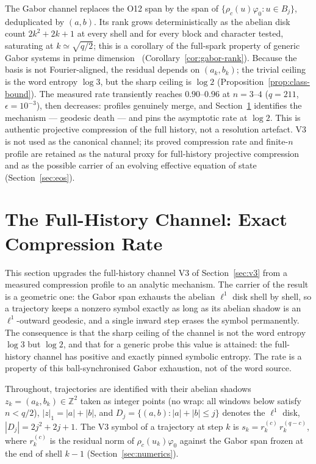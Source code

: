 \documentclass[11pt]{article}
\begin{document}
The Gabor channel replaces the O12 span by the span of $\{\rho_c(u)\varphi_0 : u\in B_j\}$, deduplicated by
$(a,b)$.
Its rank grows deterministically as the abelian disk count $2k^2+2k+1$ at every shell and for every block and
character tested, saturating at $k\simeq\sqrt{q/2}$; this is a corollary of the full-spark property of
generic Gabor systems in prime dimension~\cite{Lawrence2005,Malikiosis2015} (Corollary~\ref{cor:gabor-rank}).
Because the basis is not Fourier-aligned, the residual depends on $(a_k,b_k)$; the trivial ceiling is the
word entropy $\log 3$, but the sharp ceiling is $\log 2$ (Proposition~\ref{prop:class-bound}).
The measured rate transiently reaches $0.90$--$0.96$ at $n=3$--$4$ ($q=211$, $\epsilon=10^{-3}$), then
decreases: profiles genuinely merge, and Section~\ref{sec:fullhistory} identifies the mechanism --- geodesic
death --- and pins the asymptotic rate at $\log 2$.
This is authentic projective compression of the full history, not a resolution artefact.
V3 is not used as the canonical channel; its proved compression rate and finite-$n$ profile are retained as
the natural proxy for full-history projective compression and as the possible carrier of an evolving
effective equation of state (Section~\ref{sec:eos}).

\section{The Full-History Channel: Exact Compression Rate}
\label{sec:fullhistory}

This section upgrades the full-history channel V3 of Section~\ref{sec:v3} from a measured compression profile
to an analytic mechanism.
The carrier of the result is a geometric one: the Gabor span exhausts the abelian $\ell^1$ disk shell by
shell, so a trajectory keeps a nonzero symbol exactly as long as its abelian shadow is an $\ell^1$-outward
geodesic, and a single inward step erases the symbol permanently.
The consequence is that the sharp ceiling of the channel is not the word entropy $\log 3$ but $\log 2$, and
that for a generic probe this value is attained: the full-history channel has positive and exactly pinned
symbolic entropy.
The rate is a property of this ball-synchronised Gabor exhaustion, not of the word source.

Throughout, trajectories are identified with their abelian shadows $z_k=(a_k,b_k)\in\mathbb{Z}^2$ taken as
integer points (no wrap: all windows below satisfy $n<q/2$), $|z|_1=|a|+|b|$, and
$D_j=\{(a,b):|a|+|b|\le j\}$ denotes the $\ell^1$ disk, $|D_j|=2j^2+2j+1$.
The V3 symbol of a trajectory at step $k$ is $s_k=r^{(c)}_k\,r^{(q-c)}_k$, where $r^{(c)}_k$ is the residual
norm of $\rho_c(u_k)\varphi_0$ against the Gabor span frozen at the end of shell $k-1$
(Section~\ref{sec:numerics}).
\end{document}
